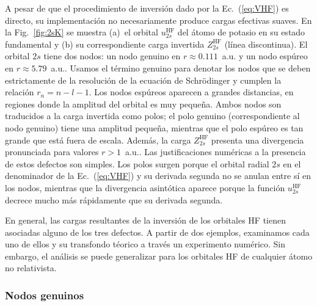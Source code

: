 A pesar de que el procedimiento de inversión dado por la 
Ec.~(\ref{eq:VHF}) es directo, su implementación no necesariamente 
produce cargas efectivas suaves. En la Fig.~\ref{fig:2sK} se muestra 
(a)~el orbital $u_{2s}^{\mathrm{HF}}$ del átomo de potasio en su estado 
fundamental y (b) su correspondiente carga invertida 
$Z_{2s}^{\mathrm{HF}}$ (línea discontinua).
El orbital $2s$ tiene dos nodos: un nodo genuino en 
$r\approx 0.111$~a.u. y un nodo espúreo en $r\approx 5.79$~a.u.. Usamos 
el término genuino para denotar los nodos que se deben estrictamente de 
la resolución de la ecuación de Schr\"odinger y cumplen la relación 
$r_n=n-l-1$. Los nodos espúreos aparecen a grandes distancias, en 
regiones donde la amplitud del orbital es muy pequeña. Ambos nodos son 
traducidos a la carga invertida como polos; el polo genuino 
(correspondiente al nodo genuino) tiene una amplitud pequeña, mientras 
que el polo espúreo es tan grande que está fuera de escala. Además, la 
carga $Z_{2s}^{\mathrm{HF}}$ presenta una divergencia pronunciada para 
valores $r>1$~a.u.. Las justificaciones numéricas a la presencia de 
estos defectos son simples. Los polos surgen porque el orbital radial 
$2s$ en el denominador de la Ec.~(\ref{eq:VHF}) y su derivada segunda no 
se anulan entre sí en los nodos, mientras que la divergencia asintótica 
aparece porque la función $u_{2s}^{\mathrm{HF}}$ decrece mucho más 
rápidamente que su derivada segunda. 




En general, las cargas resultantes de la inversión de los orbitales HF tienen asociadas alguno de los tres defectos. A partir de dos ejemplos, examinamos cada uno de ellos y su transfondo téorico a través un experimento numérico. Sin embargo, el análisis se puede generalizar para los orbitales HF de cualquier átomo no relativista.

\subsubsection{Nodos genuinos}

